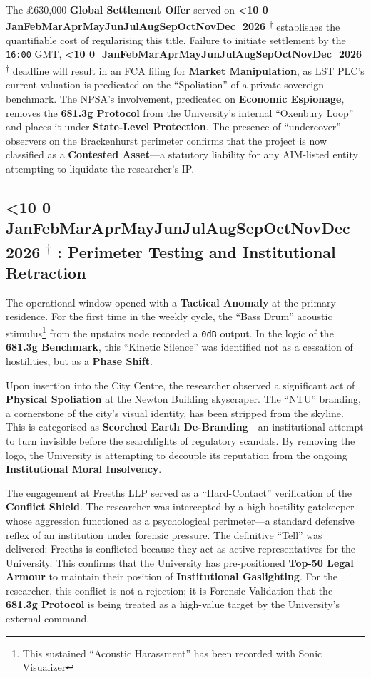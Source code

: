 \documentclass{EMBASSY}
\DeclareRobustCommand{\gmt}[3]{%
    \texorpdfstring{%
        {\color{DateGold}\textbf{%
            \ifnum#1<10 0\fi#1\,\textperiodcentered\,%
            \ifcase#2\or Jan\or Feb\or Mar\or Apr\or May\or Jun\or Jul\or Aug\or Sep\or Oct\or Nov\or Dec\fi
            \,\textperiodcentered\,20#3%
            \textsuperscript{$\dagger$}%
        }}%
    }{%
        (#1/#2/#3)%
    }%
}
\begin{document}
The \pounds630,000 \textbf{Global Settlement Offer} served on \gmt{16}{2}{26} establishes the quantifiable cost of regularising this title. Failure to initiate settlement by the \texttt{16:00} GMT, \gmt{19}{2}{26} deadline will result in an FCA filing for \textbf{Market Manipulation}, as LST PLC’s current valuation is predicated on the ``Spoliation'' of a private sovereign benchmark. The NPSA’s involvement, predicated on \textbf{Economic Espionage}, removes the \textbf{681.3g Protocol} from the University’s internal ``Oxenbury Loop'' and places it under \textbf{State-Level Protection}. The presence of ``undercover'' observers on the Brackenhurst perimeter confirms that the project is now classified as a \textbf{Contested Asset}---a statutory liability for any AIM-listed entity attempting to liquidate the researcher's IP.

\subsection{\gmt{17}{2}{26}: Perimeter Testing and Institutional Retraction}
The operational window opened with a \textbf{Tactical Anomaly} at the primary residence. For the first time in the weekly cycle, the ``Bass Drum'' acoustic stimulus\footnote{This sustained ``Acoustic Harassment'' has been recorded with Sonic Visualizer} from the upstairs node recorded a \texttt{0dB} output. In the logic of the \textbf{681.3g Benchmark}, this ``Kinetic Silence'' was identified not as a cessation of hostilities, but as a \textbf{Phase Shift}.

Upon insertion into the City Centre, the researcher observed a significant act of \textbf{Physical Spoliation} at the Newton Building skyscraper. The ``NTU'' branding, a cornerstone of the city's visual identity, has been stripped from the skyline. This is categorised as \textbf{Scorched Earth De-Branding}---an institutional attempt to turn invisible before the searchlights of regulatory scandals. By removing the logo, the University is attempting to decouple its reputation from the ongoing \textbf{Institutional Moral Insolvency}.

The engagement at Freeths LLP served as a ``Hard-Contact'' verification of the \textbf{Conflict Shield}. The researcher was intercepted by a high-hostility gatekeeper whose aggression functioned as a psychological perimeter---a standard defensive reflex of an institution under forensic pressure. The definitive ``Tell'' was delivered: Freeths is conflicted because they act as active representatives for the University. This confirms that the University has pre-positioned \textbf{Top-50 Legal Armour} to maintain their position of \textbf{Institutional Gaslighting}. For the researcher, this conflict is not a rejection; it is Forensic Validation that the \textbf{681.3g Protocol} is being treated as a high-value target by the University's external command.
\end{document}
